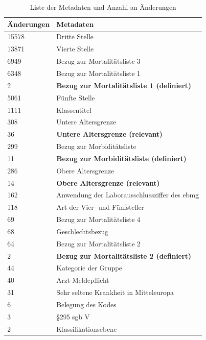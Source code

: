 \begin{table}[ht]
	\centering
	\small
	\caption[Änderungen in den Metadaten]{Liste der Metadaten und Anzahl an Änderungen}
	\label{tab:icdupd}
	\begin{tabular}{|l|p{11.5cm}|}
		\hline
		\rowcolor{lightgray} Änderungen & Metadaten \\ \hline
		15578 & Dritte Stelle \\ \hline
		13871 & Vierte Stelle \\ \hline
		6949 & Bezug zur Mortalitätsliste 3 \\ \hline		
		6348 & Bezug zur Mortalitätsliste 1 \\ \hline
		2 & \textbf{Bezug zur Mortalitätsliste 1 (definiert)} \\ \hline
		5061 & Fünfte Stelle \\ \hline
		1111 & Klassentitel \\ \hline
		308 & Untere Altersgrenze \\ \hline
		36 & \textbf{Untere Altersgrenze (relevant)} \\ \hline
		299 & Bezug zur Morbiditätsliste \\ \hline
		11 & \textbf{Bezug zur Morbiditätsliste (definiert)} \\ \hline
		286 & Obere Altersgrenze \\ \hline
		14 & \textbf{Obere Altersgrenze (relevant)} \\ \hline
		162 & Anwendung der Laborausschlussziffer des \ac{ebmg} \\ \hline
		118 & Art der Vier- und Fünfsteller \\ \hline
		69 & Bezug zur Mortalitätsliste 4 \\ \hline
		68 & Geschlechtsbezug \\ \hline
		64 & Bezug zur Mortalitätsliste 2 \\ \hline
		2 & \textbf{Bezug zur Mortalitätsliste 2 (definiert)} \\ \hline
		44 & Kategorie der Gruppe \\ \hline
		40 & Arzt-Meldepflicht \\ \hline		
		31 & Sehr seltene Krankheit in Mitteleuropa \\ \hline				
		6 & Belegung des Kodes \\ \hline
		3 & \S 295 \ac{sgb} V \\ \hline		
		2 & Klassifikationsebene \\ \hline
		
	\end{tabular}
\end{table}

